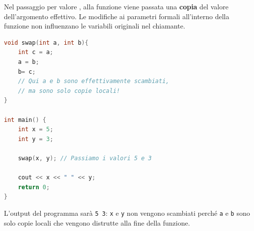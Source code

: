 \begin{codeexample}
Nel passaggio per valore , alla funzione viene passata una \textbf{copia} del valore
dell'argomento effettivo. Le modifiche ai parametri formali all'interno della funzione non
influenzano le variabili originali nel chiamante.

\begin{codebox}
\begin{lstlisting}[language=C++]
void swap(int a, int b){
    int c = a;
    a = b;
    b= c;
    // Qui a e b sono effettivamente scambiati,
    // ma sono solo copie locali!
}

int main() {
    int x = 5;
    int y = 3;

    swap(x, y); // Passiamo i valori 5 e 3

    cout << x << " " << y;
    return 0;
}
\end{lstlisting}
\end{codebox}

L'output del programma sarà \texttt{5 3}: \texttt{x} e \texttt{y} non vengono scambiati
perché \texttt{a} e \texttt{b} sono solo copie locali che vengono distrutte alla fine
della funzione.
\end{codeexample}




